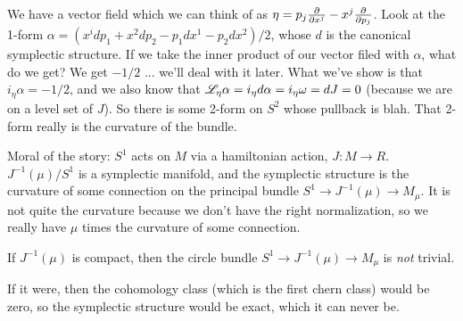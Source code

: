 We have a vector field which we can think of as $\eta = p_j\frac{\partial }{\partial x^j} - x^j\frac{\partial }{\partial p_j}$.
 Look at the 1-form $\alpha = (x^idp_1+x^2dp_2 - p_1dx^1 - p_2dx^2)/2$, whose $d$ is the
 canonical symplectic structure.  If we take the inner product of our vector filed
 with $\alpha$, what do we get?  We get $-1/2$ ... we'll deal with it later.  What
 we've show is that $i_\eta\alpha =-1/2$, and we also know that $\mathscr{L}_\eta \alpha =
 i_\eta d\alpha = i_\eta \omega = dJ=0$ (because we are on a level set of $J$).  So there
 is some 2-form on $S^2$ whose pullback is blah.  That 2-form really is the curvature
 of the bundle.

 Moral of the story: $S^1$ acts on $M$ via a hamiltonian action, $J:M\to R$.
 $J^{-1}(\mu)/S^1$ is a symplectic manifold, and the symplectic structure is the
 curvature of some connection on the principal bundle $S^1\to J^{-1}(\mu)\to M_\mu$.
 It is not quite the curvature because we don't have the right normalization, so we
 really have $\mu$ times the curvature of some connection.

 \begin{corollary}
   If $J^{-1}(\mu)$ is compact, then the circle bundle $S^1\to J^{-1}(\mu)\to M_\mu$ is
   \emph{not} trivial.
 \end{corollary}
 If it were, then the cohomology class (which is the first chern class) would be zero,
 so the symplectic structure would be exact, which it can never be.
